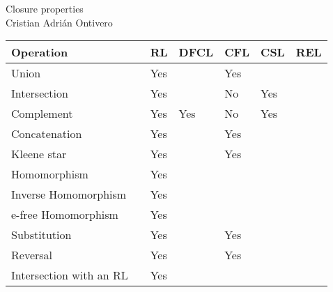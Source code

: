 \documentclass[spanish]{article}
\theoremstyle{definition}
\begin{document}
\begin{center}
  {\LARGE Closure properties}\\[.2cm]
  Cristian Adrián Ontivero \\[.05cm]%
  \isodate%
\end{center}

\vspace{0.2 cm}

\begin{table}[h]
\begin{tabular}{l|llllll}
 Operation               &                                                          & RL & DFCL & CFL & CSL & REL  \\
 \hline
 Union                   &  & Yes\footnotemark[1] \cite{Kle51} &  & Yes~\cite{Sch60, BarHillel61} & & \\
 Intersection            &  & Yes &  & No~\cite{Sch60} & Yes~\cite{Lan63} & \\
 Complement              &  & Yes & Yes \cite{Schutzenberger63, Hai65, GG65} & No~\cite{Sch60} & Yes\footnotemark[2] \cite{Imm88, Sze88} & \\
 Concatenation           &  & Yes\footnotemark[1] \cite{Kle51} &  & Yes~\cite{BarHillel61}  & & \\
 Kleene star             &  & Yes\footnotemark[1] \cite{Kle51} &  & Yes~\cite{BarHillel61} & & \\
 Homomorphism &  & Yes & &  & & \\
 Inverse Homomorphism &  & Yes &  &  & & \\
 e-free Homomorphism &  & Yes &  &  & & \\
 Substitution &  & Yes & & Yes~\cite{BarHillel61}  & & \\
 Reversal                 &  & Yes &  & Yes~\cite{BarHillel61}  & & \\
 Intersection with an RL &  & Yes & &  & & \\
\end{tabular}
\end{table}




\end{document}
